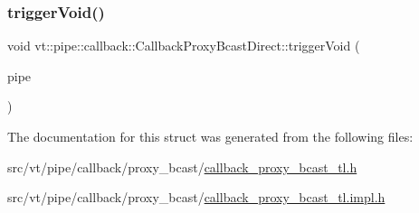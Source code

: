 \subsubsection{\texorpdfstring{trigger\+Void()}{triggerVoid()}}
{\footnotesize\ttfamily void vt\+::pipe\+::callback\+::\+Callback\+Proxy\+Bcast\+Direct\+::trigger\+Void (\begin{DoxyParamCaption}\item[{\hyperlink{namespacevt_ac9852acda74d1896f48f406cd72c7bd3}{Pipe\+Type} const \&}]{pipe }\end{DoxyParamCaption})\hspace{0.3cm}{\ttfamily [inline]}}



The documentation for this struct was generated from the following files\+:\begin{DoxyCompactItemize}
\item 
src/vt/pipe/callback/proxy\+\_\+bcast/\hyperlink{callback__proxy__bcast__tl_8h}{callback\+\_\+proxy\+\_\+bcast\+\_\+tl.\+h}\item 
src/vt/pipe/callback/proxy\+\_\+bcast/\hyperlink{callback__proxy__bcast__tl_8impl_8h}{callback\+\_\+proxy\+\_\+bcast\+\_\+tl.\+impl.\+h}\end{DoxyCompactItemize}
